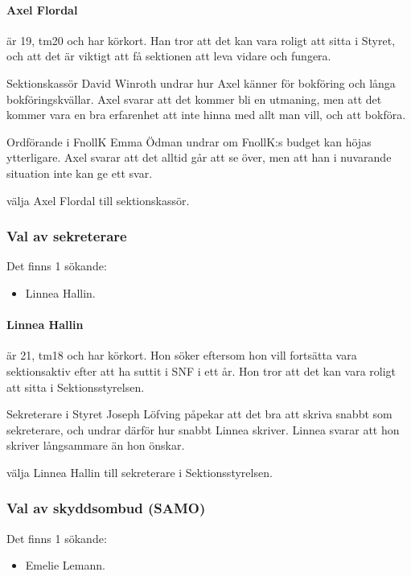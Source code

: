 \documentclass[hidelinks]{sektionsmote}
\begin{document}
\paragraph{Axel Flordal} är 19, tm20 och har körkort.
Han tror att det kan vara roligt att sitta i Styret, och att det är viktigt att få sektionen att leva vidare och fungera.

Sektionskassör David Winroth undrar hur Axel känner för bokföring och långa bokföringskvällar.
Axel svarar att det kommer bli en utmaning, men att det kommer vara en bra erfarenhet att inte hinna med allt man vill, och att bokföra.

Ordförande i FnollK Emma Ödman undrar om FnollK:s budget kan höjas ytterligare.
Axel svarar att det alltid går att se över, men att han i nuvarande situation inte kan ge ett svar.

\begin{beslut}
  \item välja Axel Flordal till sektionskassör.
\end{beslut}

\subsubsection{Val av sekreterare}
Det finns 1 sökande:
\begin{itemize}
    \item Linnea Hallin.
\end{itemize}

\paragraph{Linnea Hallin} är 21, tm18 och har körkort.
Hon söker eftersom hon vill fortsätta vara sektionsaktiv efter att ha suttit i SNF i ett år.
Hon tror att det kan vara roligt att sitta i Sektionsstyrelsen.

Sekreterare i Styret Joseph Löfving påpekar att det bra att skriva snabbt som sekreterare, och undrar därför hur snabbt Linnea skriver.
Linnea svarar att hon skriver långsammare än hon önskar.

\begin{beslut}
  \item välja Linnea Hallin till sekreterare i Sektionsstyrelsen.
\end{beslut}

\subsubsection{Val av skyddsombud (SAMO)}
Det finns 1 sökande:
\begin{itemize}
    \item Emelie Lemann.
\end{itemize}
\end{document}

